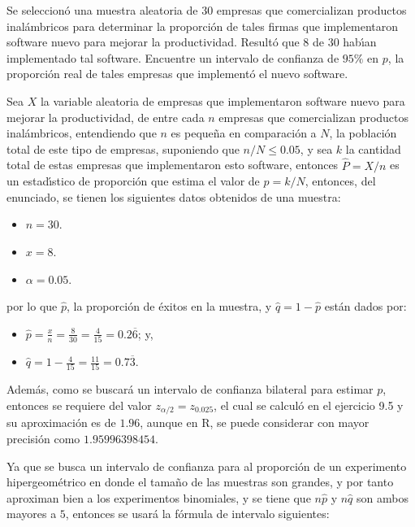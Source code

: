 \begin{enunciado}
 Se seleccion\'o una muestra aleatoria de $30$ empresas que comercializan productos inal\'ambricos para determinar la proporci\'on de tales firmas que implementaron software nuevo para mejorar la productividad. Result\'o que $8$ de $30$ hab\'{\i}an implementado tal software. Encuentre un intervalo de confianza de $95\%$ en $p$, la proporci\'on real de tales empresas que implement\'o el nuevo software.
\end{enunciado}

\begin{solucion}
 Sea $X$ la variable aleatoria de empresas que implementaron software nuevo para mejorar la productividad, de entre cada $n$ empresas que comercializan productos inal\'ambricos, entendiendo que $n$ es peque\~na en comparaci\'on a $N$, la poblaci\'on total de este tipo de empresas, suponiendo que $n/N \leq 0.05$, y sea $k$ la cantidad total de estas empresas que implementaron esto software, entonces $\widehat{P} = X/n$ es un estad\'{\i}stico de proporci\'on que estima el valor de $p = k/N$, entonces, del enunciado, se tienen los siguientes datos obtenidos de una muestra:
 \begin{itemize}
  \item $n = 30$.
  \item $x = 8$.
  \item $\alpha = 0.05$.
 \end{itemize}
 por lo que $\hat{p}$, la proporci\'on de \'exitos en la muestra, y $\hat{q} = 1 - \hat{p}$ est\'an dados por:
 \begin{itemize}
  \item $\hat{p} = \frac{x}{n} = \frac{8}{30} = \frac{4}{15} = 0.2\overline{6}$; y,
  \item $\hat{q} = 1 - \frac{4}{15} = \frac{11}{15} = 0.7\overline{3}$.
 \end{itemize}
 Adem\'as, como se buscar\'a un intervalo de confianza bilateral para estimar $p$, entonces se requiere del valor $z_{\alpha/2} = z_{0.025}$, el cual se calcul\'o en el ejercicio 9.5 y su aproximaci\'on es de $1.96$, aunque en R, se puede considerar con mayor precisi\'on como $1.95996398454$.
 \par 
 Ya que se busca un intervalo de confianza para al proporci\'on de un experimento hipergeom\'etrico en donde el tama\~no de las muestras son grandes, y por tanto aproximan bien a los experimentos binomiales, y se tiene que $n\hat{p}$ y $n\hat{q}$ son ambos mayores a $5$, entonces se usar\'a la f\'ormula de intervalo siguientes:

\end{solucion}
